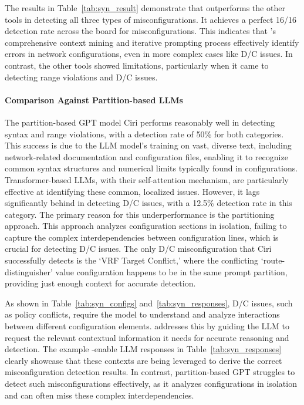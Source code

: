 The results in Table~\ref{tab:syn_result} demonstrate that \sysname{} outperforms the other tools in detecting all three types of misconfigurations. It achieves a perfect 16/16 detection rate across the board for misconfigurations. This indicates that \sysname{}'s comprehensive context mining and iterative prompting process effectively identify errors in network configurations, even in more complex cases like D/C issues. In contrast, the other tools showed limitations, particularly when it came to detecting range violations and D/C issues.


\paragraph{Comparison Against Partition-based LLMs} The partition-based GPT model Ciri performs reasonably well in detecting syntax and range violations, with a detection rate of 50\% for both categories.
This success is due to the LLM model's training on vast, diverse text, including network-related documentation and configuration files, enabling it to recognize common syntax structures and numerical limits typically found in configurations. Transformer-based LLMs, with their self-attention mechanism, are particularly effective at identifying these common, localized issues.
However, it lags significantly behind \sysname{} in detecting D/C issues, with a 12.5\% detection rate in this category. The primary reason for this underperformance is the partitioning approach. This approach analyzes configuration sections in isolation, failing to capture the complex interdependencies between configuration lines, which is crucial for detecting D/C issues. The only D/C misconfiguration that Ciri successfully detects is the `VRF Target Conflict,' where the conflicting `route-distinguisher' value configuration happens to be in the same prompt partition, providing just enough context for accurate detection.

As shown in Table~\ref{tab:syn_configs} and~\ref{tab:syn_responses}, D/C issues, such as policy conflicts, require the model to understand and analyze interactions between different configuration elements.
\sysname{} addresses this by guiding the LLM to request the relevant contextual information it needs for accurate reasoning and detection. The example \sysname{}-enable LLM responses in Table~\ref{tab:syn_responses} clearly showcase that these contexts are being leveraged to derive the correct misconfiguration detection results. In contrast, partition-based GPT struggles to detect such misconfigurations effectively, as it analyzes configurations in isolation and can often miss these complex interdependencies.

